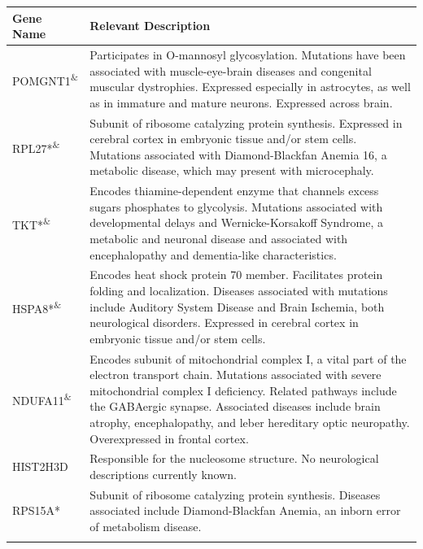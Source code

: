 \documentclass[10pt, oneside]{article}
\begin{document}
\begin{table}[!]
    \centering
{}
\begin{tabular}{p{2cm}p{15cm}}
 \textbf{Gene Name} & \textbf{Relevant Description} \\
 \hline
 POMGNT1\textsuperscript{\&} & Participates in O-mannosyl glycosylation. Mutations have been associated with muscle-eye-brain diseases and congenital muscular dystrophies. Expressed especially in astrocytes, as well as in immature and mature neurons. Expressed across brain. \\
 \hline
 RPL27*\textsuperscript{\&} & Subunit of ribosome catalyzing protein synthesis. Expressed in cerebral cortex in embryonic tissue and/or stem cells. Mutations associated with Diamond-Blackfan Anemia 16, a metabolic disease, which may present with microcephaly. \\
 \hline
 TKT*\textsuperscript{\&} & Encodes thiamine-dependent enzyme that channels excess sugars phosphates to glycolysis. Mutations associated with developmental delays and Wernicke-Korsakoff Syndrome, a metabolic and neuronal disease and associated with encephalopathy and dementia-like characteristics. \\
 \hline
 HSPA8*\textsuperscript{\&} & Encodes heat shock protein 70 member. Facilitates protein folding and localization. Diseases associated with mutations include Auditory System Disease and Brain Ischemia, both neurological disorders. Expressed in cerebral cortex in embryonic tissue and/or stem cells. \\
 \hline
 NDUFA11\textsuperscript{\&} & Encodes subunit of mitochondrial complex I, a vital part of the electron transport chain. Mutations associated with severe mitochondrial complex I deficiency. Related pathways include the GABAergic synapse. Associated diseases include brain atrophy, encephalopathy, and leber hereditary optic neuropathy. Overexpressed in frontal cortex. \\
 \hline
 HIST2H3D & Responsible for the nucleosome structure. No neurological descriptions currently known. \\
 \hline
 RPS15A* & Subunit of ribosome catalyzing protein synthesis. Diseases associated include Diamond-Blackfan Anemia, an inborn error of metabolism disease. \\
 \label{tab:targets}
\end{tabular}
\end{table}
\end{document}
